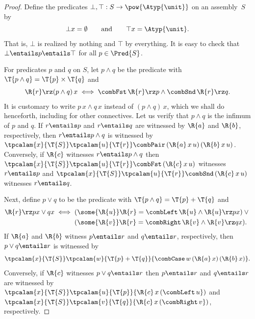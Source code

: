 \begin{proof}
  Define the predicates $\bot, \top : S \to \pow{\Atyp{\unit}}$ on an assembly~$S$ by
  \begin{equation*}
    \bot x= \emptyset
    \qquad\text{and}\qquad
    \top x = \Atyp{\unit}.
  \end{equation*}
  That is, $\bot$ is realized by nothing and $\top$ by everything. It is
  easy to check that $\bot \entails p \entails \top$ for all $p \in
  \Pred{S}$.

  For predicates $p$ and $q$ on $S$, let $p \land q$ be the
  predicate with $\T{p \land q} = \T{p} \times
  \T{q}$ and
  \begin{equation*}
    \R{r} \rz (p \land q) \, x
    \iff
    \combFst\,\R{r} \rz p \land \combSnd\,\R{r} \rz q.
  \end{equation*}
  It is customary to write $p \, x \land q \, x$ instead of $(p \land q) \, x$, which we shall do henceforth, including for other connectives.
  Let us verify that $p \land q$ is the infimum of $p$ and $q$. If $r \entails p$ and
  $r \entails q$ are witnessed by $\R{a}$ and $\R{b}$, respectively, then $r \entails p \land q$
  is witnessed by $\tpcalam{x}{\T{S}} \tpcalam{u}{\T{r}} \combPair\,(\R{a}\,x\,u)\,(\R{b}\,x\,u)$.
  Conversely, if $\R{c}$ witnesses $r \entails p \land q$ then
  $\tpcalam{x}{\T{S}} \tpcalam{u}{\T{r}} \combFst\,(\R{c}\,x\,u)$ witnesses $r \entails p$ and $\tpcalam{x}{\T{S}} \tpcalam{u}{\T{r}} \combSnd\,(\R{c}\,x\,u)$ witnesses $r \entails q$.

  Next, define $p \lor q$ to be the predicate with $\T{p \land q} = \T{p} + \T{q}$ and
  \begin{equation*}
    \R{r} \rz p x \lor q x
    \iff
    \begin{aligned}[t]
      & (\some{\R{u}} \R{r} = \combLeft\,\R{u} \land \R{u} \rz p x)
      \lor {} \\
      & (\some{\R{v}} \R{r} = \combRight\,\R{v} \land \R{v} \rz q x).
    \end{aligned}
  \end{equation*}
  If $\R{a}$ and $\R{b}$ witness $p \entails r$ and $q \entails r$, respectively, then
  $p \lor q \entails r$ is witnessed by
  \begin{equation*}
    \tpcalam{x}{\T{S}} \tpcalam{w}{\T{p}+\T{q}}{
      \combCase\,w\,(\R{a}\,x)\,(\R{b}\,x)
    }.
  \end{equation*}
  Conversely, if $\R{c}$ witnesses $p \lor q \entails r$ then
  $p \entails r$ and $q \entails r$ are witnessed by
  $\tpcalam{x}{\T{S}} \tpcalam{u}{\T{p}}{\R{c}\,x\,(\combLeft\,u})$
  and
  $\tpcalam{x}{\T{S}} \tpcalam{v}{\T{q}}{\R{c}\,x\,(\combRight\,v})$,
  respectively.


\end{proof}
